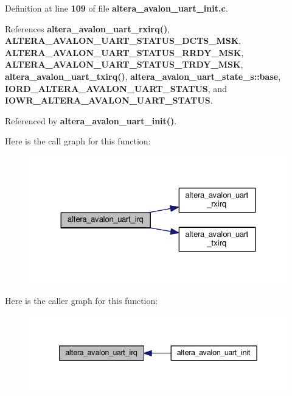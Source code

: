 Definition at line {\bf 109} of file {\bf altera\+\_\+avalon\+\_\+uart\+\_\+init.\+c}.



References {\bf altera\+\_\+avalon\+\_\+uart\+\_\+rxirq()}, {\bf A\+L\+T\+E\+R\+A\+\_\+\+A\+V\+A\+L\+O\+N\+\_\+\+U\+A\+R\+T\+\_\+\+S\+T\+A\+T\+U\+S\+\_\+\+D\+C\+T\+S\+\_\+\+M\+SK}, {\bf A\+L\+T\+E\+R\+A\+\_\+\+A\+V\+A\+L\+O\+N\+\_\+\+U\+A\+R\+T\+\_\+\+S\+T\+A\+T\+U\+S\+\_\+\+R\+R\+D\+Y\+\_\+\+M\+SK}, {\bf A\+L\+T\+E\+R\+A\+\_\+\+A\+V\+A\+L\+O\+N\+\_\+\+U\+A\+R\+T\+\_\+\+S\+T\+A\+T\+U\+S\+\_\+\+T\+R\+D\+Y\+\_\+\+M\+SK}, {\bf altera\+\_\+avalon\+\_\+uart\+\_\+txirq()}, {\bf altera\+\_\+avalon\+\_\+uart\+\_\+state\+\_\+s\+::base}, {\bf I\+O\+R\+D\+\_\+\+A\+L\+T\+E\+R\+A\+\_\+\+A\+V\+A\+L\+O\+N\+\_\+\+U\+A\+R\+T\+\_\+\+S\+T\+A\+T\+US}, and {\bf I\+O\+W\+R\+\_\+\+A\+L\+T\+E\+R\+A\+\_\+\+A\+V\+A\+L\+O\+N\+\_\+\+U\+A\+R\+T\+\_\+\+S\+T\+A\+T\+US}.



Referenced by {\bf altera\+\_\+avalon\+\_\+uart\+\_\+init()}.



Here is the call graph for this function\+:
\nopagebreak
\begin{figure}[H]
\begin{center}
\leavevmode
\includegraphics[width=324pt]{d8/ddb/altera__avalon__uart__init_8c_a6b6d97750e63cb70b674746361e8ed80_cgraph}
\end{center}
\end{figure}




Here is the caller graph for this function\+:
\nopagebreak
\begin{figure}[H]
\begin{center}
\leavevmode
\includegraphics[width=342pt]{d8/ddb/altera__avalon__uart__init_8c_a6b6d97750e63cb70b674746361e8ed80_icgraph}
\end{center}
\end{figure}


